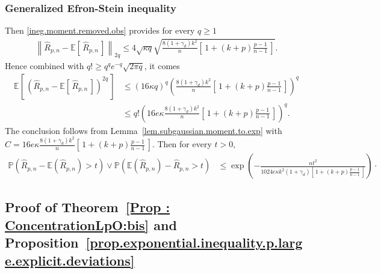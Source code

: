 \documentclass[twoside,11pt]{article}
\numberwithin{equation}{section}
\newcommand{\prob}[1]{\mathbb{P}\left(#1 \right)}
\newcommand{\1}{\mathds{1}}%
\newcommand{\paren}[1]{\left( #1 \right)}
\newcommand{\croch}[1]{\left[\, #1 \,\right]}
\newcommand{\norm}[1]{\left\| #1 \right\|}
\newcommand{\E}{\mathbb{E}}
\newcommand{\Rh}{\widehat{R}}
\numberwithin{equation}{section}
\theoremstyle{plain}
\begin{document}
\subsubsection{Generalized Efron-Stein inequality}
%
Then \eqref{ineg.moment.removed.obs} provides for every $q\geq 1$
\begin{align*}
  \norm{ \Rh_{p,n} - \E\croch{\Rh_{p,n}} }_{2q} \leq 4 \sqrt{\kappa q } \sqrt{ \frac{8(1+\gamma_d )k^2}{n} \croch{1 + (k+p)\frac{p-1}{n-1}} }.
\end{align*}
%
Hence combined with $q! \geq q^q e^{-q} \sqrt{2\pi q}$, it comes
\begin{align*}
  \E\croch{ \paren{ \Rh_{p,n} - \E\croch{\Rh_{p,n}} }^{2q} } & \leq \paren{ 16 \kappa q }^q \paren{ \frac{8(1+\gamma_d )k^2 }{n} \croch{1 + (k+p)\frac{p-1}{n-1}} }^q \\
%
& \leq q! \paren{ 16 e\kappa  \frac{8(1+\gamma_d )k^2}{n} \croch{1 + (k+p)\frac{p-1}{n-1}} }^q .
\end{align*}
%
The conclusion follows from Lemma~\ref{lem.subgaussian.moment.to.exp} with $C = 16 e\kappa  \frac{8(1+\gamma_d )k^2 }{n} \croch{1 + (k+p)\frac{p-1}{n-1}}$.
%
Then for every $t>0$,
\begin{align*}
 \prob{  \Rh_{p,n} - \E\paren{ \Rh_{p,n} }  > t  } \vee \prob{ \E\paren{ \Rh_{p,n} } - \Rh_{p,n} > t  }
& \leq  \exp \paren{ -  \frac{  nt^2 }{ 1024 e\kappa  k^2(1+\gamma_d)  \croch{1 + (k+p)\frac{p-1}{n-1}} } } \cdot
\end{align*}




















\subsection{Proof of Theorem~\ref{Prop : ConcentrationLpO:bis} and Proposition~\ref{prop.exponential.inequality.p.large.explicit.deviations}}
%
\label{Appendix:ConcentrationLpObis}
\end{document}

